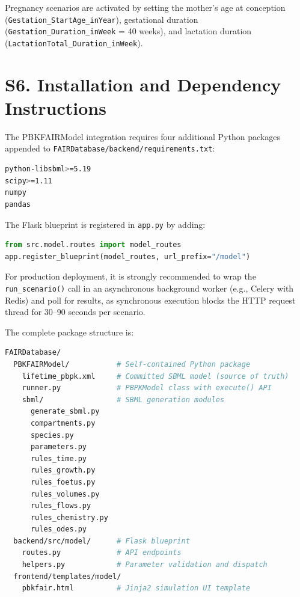 \documentclass[12pt]{article}
\begin{document}

Pregnancy scenarios are activated by setting the mother's age at
conception (\texttt{Gestation\_StartAge\_inYear}), gestational
duration (\texttt{Gestation\_Duration\_inWeek} = 40 weeks), and
lactation duration (\texttt{LactationTotal\_Duration\_inWeek}).

\section*{S6. Installation and Dependency Instructions}

The PBKFAIRModel integration requires four additional Python packages
appended to \texttt{FAIRDatabase/backend/requirements.txt}:

\begin{lstlisting}[language=bash, caption={Additional Python dependencies}]
python-libsbml>=5.19
scipy>=1.11
numpy
pandas
\end{lstlisting}

The Flask blueprint is registered in \texttt{app.py} by adding:

\begin{lstlisting}[language=Python, caption={Blueprint registration in
FAIRDatabase app.py}]
from src.model.routes import model_routes
app.register_blueprint(model_routes, url_prefix="/model")
\end{lstlisting}

For production deployment, it is strongly recommended to wrap the
\texttt{run\_scenario()} call in an asynchronous background worker
(e.g., Celery with Redis) and poll for results, as synchronous
execution blocks the HTTP request thread for 30--90 seconds per
scenario.

The complete package structure is:

\begin{lstlisting}[language=bash, caption={PBKFAIRModel package structure
within the FAIRDatabase repository}]
FAIRDatabase/
  PBKFAIRModel/           # Self-contained Python package
    lifetime_pbpk.xml     # Committed SBML model (source of truth)
    runner.py             # PBPKModel class with execute() API
    sbml/                 # SBML generation modules
      generate_sbml.py
      compartments.py
      species.py
      parameters.py
      rules_time.py
      rules_growth.py
      rules_foetus.py
      rules_volumes.py
      rules_flows.py
      rules_chemistry.py
      rules_odes.py
  backend/src/model/      # Flask blueprint
    routes.py             # API endpoints
    helpers.py            # Parameter validation and dispatch
  frontend/templates/model/
    pbkfair.html          # Jinja2 simulation UI template
\end{lstlisting}
\end{document}
